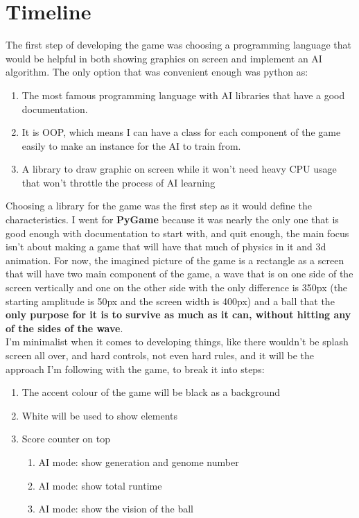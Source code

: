 
\chapter{Timeline}
The first step of developing the game was choosing a programming language that would be helpful in both showing graphics on screen and implement an AI algorithm. The only option that was convenient enough was python as:

\begin{enumerate}
	\item The most famous programming language with AI libraries that have a good documentation.
	\item It is OOP, which means I can have a class for each component of the game easily to make an instance for the AI to train from.
	\item A library to draw graphic on screen while it won't need heavy CPU usage that won't throttle the process of AI learning 
\end{enumerate}

Choosing a library for the game was the first step as it would define the characteristics. I went for \textbf{PyGame} because it was nearly the only one that is good enough with documentation to start with, and quit enough, the main focus isn't about making a game that will have that much of physics in it and 3d animation. For now, the imagined picture of the game is a rectangle as a screen that will have two main component of the game, a wave that is on one side of the screen vertically and one on the other side with the only difference is 350px (the starting amplitude is 50px and the screen width is 400px) and a ball that the \textbf{only purpose for it is to survive as much as it can, without hitting any of the sides of the wave}.\\


I'm minimalist when it comes to developing things, like there wouldn't be splash screen all over, and hard controls, not even hard rules, and it will be the approach I'm following with the game, to break it into steps:

\begin{enumerate}
	\item The accent colour of the game will be black as a background
	\item White will be used to show elements 
	\item Score counter on top
	  \begin{enumerate}
		\item AI mode: show generation and genome number
		\item AI mode: show total runtime
		\item AI mode: show the vision of the ball
	\end{enumerate}
\end{enumerate}

